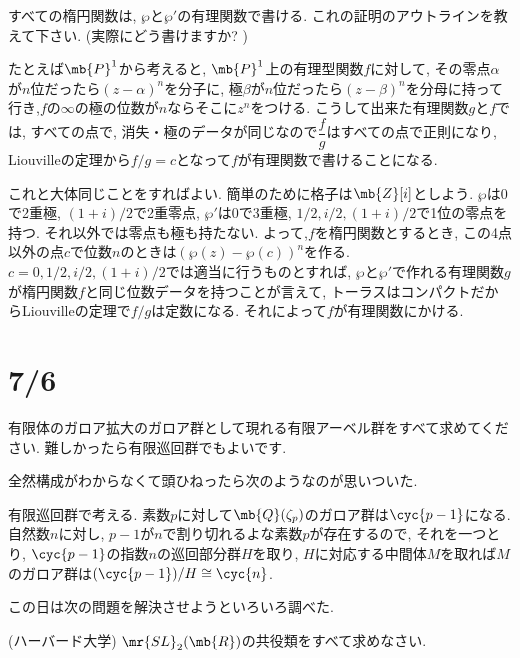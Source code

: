 \begin{prob}
すべての楕円関数は, $\wp$と$\wp'$の有理関数で書ける. これの証明のアウトラインを教えて下さい. (実際にどう書けますか? )
\end{prob}
\begin{ans}
たとえば$\mb{P}^1$から考えると, $\mb{P}^1$上の有理型関数$f$に対して, その零点$\alpha$が$n$位だったら$(z-\alpha)^{n}$を分子に, 極$\beta$が$n$位だったら$(z-\beta)^{n}$を分母に持って行き,$f$の$\infty$の極の位数が$n$ならそこに$z^n$をつける. こうして出来た有理関数$g$と$f$では, すべての点で, 消失・極のデータが同じなので$\dfrac{f}{g}$はすべての点で正則になり, Liouvilleの定理から$f/g = c$となって$f$が有理関数で書けることになる. \par 
これと大体同じことをすればよい. 簡単のために格子は$\mb{Z}[i]$としよう. $\wp$は$0$で2重極, $(1+i)/2$で2重零点, $\wp'$は$0$で3重極, $1/2, i/2, (1+i)/2$で1位の零点を持つ. それ以外では零点も極も持たない. よって,$f$を楕円関数とするとき, この4点以外の点$c$で位数$n$のときは$(\wp(z) - \wp(c))^{n}$を作る.  $c=0,1/2,i/2,(1+i)/2$では適当に行うものとすれば, $\wp$と$\wp'$で作れる有理関数$g$が楕円関数$f$と同じ位数データを持つことが言えて, トーラスはコンパクトだからLiouvilleの定理で$f/g$は定数になる. それによって$f$が有理関数にかける.
\end{ans}

\section{7/6}

\begin{prob}
有限体のガロア拡大のガロア群として現れる有限アーベル群をすべて求めてください. 難しかったら有限巡回群でもよいです. 
\end{prob}
全然構成がわからなくて頭ひねったら次のようなのが思いついた.
\begin{ans}
有限巡回群で考える. 素数$p$に対して$\mb{Q}(\zeta_{p})$のガロア群は$\cyc{p-1}$になる. 自然数$n$に対し, $p-1$が$n$で割り切れるよな素数$p$が存在するので, それを一つとり, $\cyc{p-1}$の指数$n$の巡回部分群$H$を取り, $H$に対応する中間体$M$を取れば$M$のガロア群は$(\cyc{p-1})/ H \cong \cyc{n}$. 
\end{ans}
この日は次の問題を解決させようといろいろ調べた. 
\begin{prob} (ハーバード大学)
$\mr{SL}_{2}(\mb{R})$の共役類をすべて求めなさい.
\end{prob}

